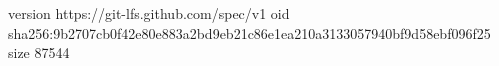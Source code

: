 version https://git-lfs.github.com/spec/v1
oid sha256:9b2707cb0f42e80e883a2bd9eb21c86e1ea210a3133057940bf9d58ebf096f25
size 87544
